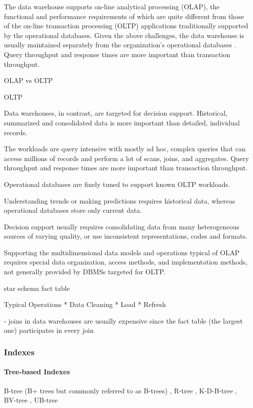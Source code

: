 \documentclass[12pt,a4paper]{article}
\begin{document}
The data warehouse supports on-line analytical processing (OLAP), the functional and performance requirements of which are quite different from those of the
on-line transaction processing (OLTP) applications traditionally supported by the operational databases. Given the above challenges, the data warehouse is
usually maintained separately from the organization’s operational databases \cite{248616}. Query throughput and response times are more important than
transaction throughput.

OLAP vs OLTP 

OLTP \cite{sen2005comparison}

Data warehouses, in contrast, are targeted for decision support. Historical, summarized and consolidated data is more important than detailed, individual records.

The workloads are query intensive with mostly ad hoc, complex queries that can access millions of records and perform a lot of scans, joins, and aggregates.
Query throughput and response times are more important than transaction throughput.


Operational databases are finely tuned to support known OLTP workloads.

Understanding trends or making predictions requires historical data, whereas operational databases store only current data.

Decision support usually requires consolidating data from many heterogeneous sources of varying quality, or use inconsistent representations, codes and formats.

Supporting the multidimensional data models and operations typical of OLAP requires special data organization, access methods, and implementation methods, not
generally provided by DBMSs targeted for OLTP.



star schema
fact table

Typical Operations
    * Data Cleaning
    * Load
    * Refresh

- joins in data warehouses are usually expensive since the fact table (the largest one) participates in every join \cite{628286}

\subsubsection{Indexes}
\paragraph{Tree-based Indexes}
B-tree (B+ trees but commonly referred to as B-trees) \cite{253268}, R-tree \cite{602266, Cheung20011}, K-D-B-tree \cite{582321}, BV-tree \cite{223796}, UB-tree
\cite{bayer1997universal}
\end{document}
